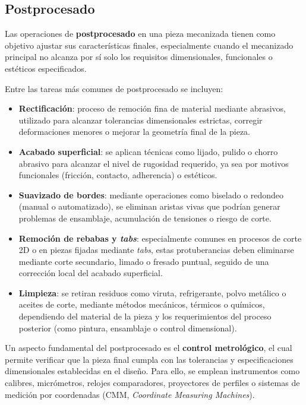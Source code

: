 \subsection{Postprocesado}

Las operaciones de \textbf{postprocesado} en una pieza mecanizada tienen como objetivo ajustar sus características finales, especialmente cuando el mecanizado principal no alcanza por sí solo los requisitos dimensionales, funcionales o estéticos especificados.

Entre las tareas más comunes de postprocesado se incluyen:

\begin{itemize}
	\item \textbf{Rectificación}: proceso de remoción fina de material mediante abrasivos, utilizado para alcanzar tolerancias dimensionales estrictas, corregir deformaciones menores o mejorar la geometría final de la pieza.
	
	\item \textbf{Acabado superficial}: se aplican técnicas como lijado, pulido o chorro abrasivo para alcanzar el nivel de rugosidad requerido, ya sea por motivos funcionales (fricción, contacto, adherencia) o estéticos.
	
	\item \textbf{Suavizado de bordes}: mediante operaciones como biselado o redondeo (manual o automatizado), se eliminan aristas vivas que podrían generar problemas de ensamblaje, acumulación de tensiones o riesgo de corte.
	
	\item \textbf{Remoción de rebabas y \textit{tabs}}: especialmente comunes en procesos de corte 2D o en piezas fijadas mediante \textit{tabs}, estas protuberancias deben eliminarse mediante corte secundario, limado o fresado puntual, seguido de una corrección local del acabado superficial.
	
	\item \textbf{Limpieza}: se retiran residuos como viruta, refrigerante, polvo metálico o aceites de corte, mediante métodos mecánicos, térmicos o químicos, dependiendo del material de la pieza y los requerimientos del proceso posterior (como pintura, ensamblaje o control dimensional).
\end{itemize}

Un aspecto fundamental del postprocesado es el \textbf{control metrológico}, el cual permite verificar que la pieza final cumpla con las tolerancias y especificaciones dimensionales establecidas en el diseño. Para ello, se emplean instrumentos como calibres, micrómetros, relojes comparadores, proyectores de perfiles o sistemas de medición por coordenadas (CMM, \textit{Coordinate Measuring Machines}).